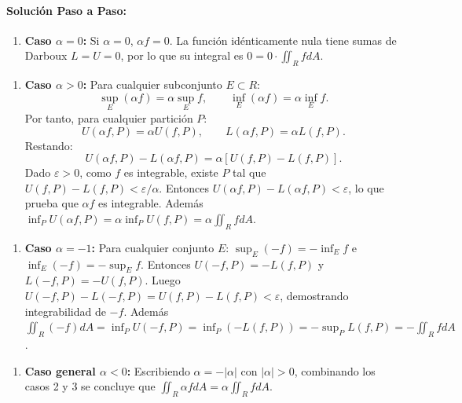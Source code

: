 \documentclass[11pt,a4paper]{article}
\begin{document}
\paragraph{Solución Paso a Paso:}\par
\begin{enumerate}[label=\textbf{\arabic*.}]
\item \textbf{Caso $\alpha = 0$:}
Si $\alpha = 0$, $\alpha f = 0$. La función idénticamente nula tiene sumas de Darboux $L = U = 0$, por lo que su integral es $0 = 0 \cdot \iint_R f dA$.
\end{enumerate}

\begin{enumerate}[label=\textbf{\arabic*.}]
\item \textbf{Caso $\alpha > 0$:}
Para cualquier subconjunto $E \subset R$:
\begin{equation*}
\sup_E (\alpha f) = \alpha \sup_E f, \qquad \inf_E (\alpha f) = \alpha \inf_E f.
\end{equation*}
Por tanto, para cualquier partición $P$:
\begin{equation*}
U(\alpha f, P) = \alpha U(f, P), \qquad L(\alpha f, P) = \alpha L(f, P).
\end{equation*}
Restando:
\begin{equation*}
U(\alpha f, P) - L(\alpha f, P) = \alpha [U(f, P) - L(f, P)].
\end{equation*}
Dado $\varepsilon > 0$, como $f$ es integrable, existe $P$ tal que $U(f, P) - L(f, P) < \varepsilon / \alpha$.
Entonces $U(\alpha f, P) - L(\alpha f, P) < \varepsilon$, lo que prueba que $\alpha f$ es integrable.
Además $\inf_P U(\alpha f, P) = \alpha \inf_P U(f, P) = \alpha \iint_R f dA$.
\end{enumerate}

\begin{enumerate}[label=\textbf{\arabic*.}]
\item \textbf{Caso $\alpha = -1$:}
Para cualquier conjunto $E$: $\sup_E (-f) = -\inf_E f$ e $\inf_E (-f) = -\sup_E f$.
Entonces $U(-f, P) = -L(f, P)$ y $L(-f, P) = -U(f, P)$.
Luego $U(-f, P) - L(-f, P) = U(f, P) - L(f, P) < \varepsilon$, demostrando integrabilidad de $-f$.
Además $\iint_R (-f) dA = \inf_P U(-f, P) = \inf_P (-L(f, P)) = -\sup_P L(f, P) = -\iint_R f dA$.
\end{enumerate}

\begin{enumerate}[label=\textbf{\arabic*.}]
\item \textbf{Caso general $\alpha < 0$:}
Escribiendo $\alpha = -|\alpha|$ con $|\alpha| > 0$, combinando los casos 2 y 3 se concluye que $\iint_R \alpha f dA = \alpha \iint_R f dA$.
\end{enumerate}
\end{document}
